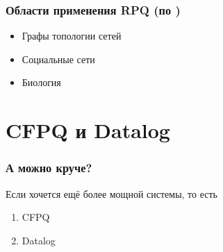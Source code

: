 \documentclass[
    aspectratio=169,
]{beamer}
\begin{document}
\begin{frame}
    \frametitle{Области применения RPQ (по \cite{garcia_path_2024,bonifati_querying_2018})}

    \begin{itemize}
        \item Графы топологии сетей
        \item Социальные сети
        \item Биология
    \end{itemize}

\end{frame}

\section{CFPQ и Datalog}

\begin{frame}
    \frametitle{А можно круче?}

    Если хочется ещё более мощной системы, то есть
    \begin{enumerate}
        \item CFPQ
        \item Datalog
    \end{enumerate}

\end{frame}
\end{document}
